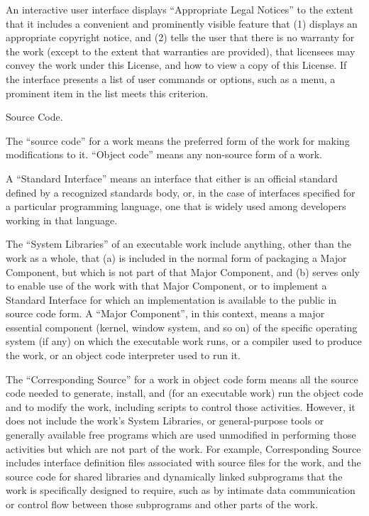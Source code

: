 An interactive user interface displays ``Appropriate Legal Notices'' to the extent that it includes a convenient and prominently visible feature that (1) displays an appropriate copyright notice, and (2) tells the user that there is no warranty for the work (except to the extent that warranties are provided), that licensees may convey the work under this License, and how to view a copy of this License.  If the interface presents a list of user commands or options, such as a menu, a prominent item in the list meets this criterion.

\item Source Code.

The ``source code'' for a work means the preferred form of the work for making modifications to it.  ``Object code'' means any non-source form of a work.

A ``Standard Interface'' means an interface that either is an official standard defined by a recognized standards body, or, in the case of interfaces specified for a particular programming language, one that is widely used among developers working in that language.

The ``System Libraries'' of an executable work include anything, other than the work as a whole, that (a) is included in the normal form of packaging a Major Component, but which is not part of that Major Component, and (b) serves only to enable use of the work with that Major Component, or to implement a Standard Interface for which an implementation is available to the public in source code form.  A ``Major Component'', in this context, means a major essential component (kernel, window system, and so on) of the specific operating system (if any) on which the executable work runs, or a compiler used to produce the work, or an object code interpreter used to run it.

The ``Corresponding Source'' for a work in object code form means all the source code needed to generate, install, and (for an executable work) run the object code and to modify the work, including scripts to control those activities.  However, it does not include the work's System Libraries, or general-purpose tools or generally available free programs which are used unmodified in performing those activities but which are not part of the work.  For example, Corresponding Source includes interface definition files associated with source files for the work, and the source code for shared libraries and dynamically linked subprograms that the work is specifically designed to require, such as by intimate data communication or control flow between those subprograms and other parts of the work.

